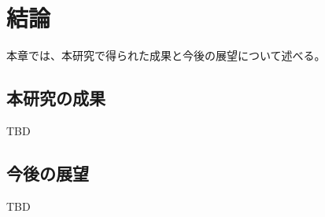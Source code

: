 \chapter{結論}
\label{chap:conclusion}

本章では、本研究で得られた成果と今後の展望について述べる。

\newpage

\section{本研究の成果}

TBD

\section{今後の展望}

TBD
